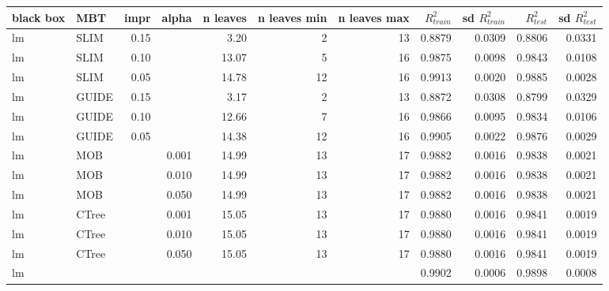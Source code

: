 \begin{table}[!htb]

\centering \tiny
\begin{tabular}[t]{l|l|r|r|r|r|r|r|r|r|r}
\hline
black box & MBT & impr & alpha & n leaves & n leaves min & n leaves max &  $R^2_{train}$ & sd $R^2_{train}$ & $R^2_{test}$ & sd $R^2_{test}$\\
\hline
lm & SLIM & 0.15 & & 3.20 & 2 & 13 & 0.8879 & 0.0309 & 0.8806 & 0.0331\\
lm & SLIM & 0.10 & & 13.07 & 5 & 16 & 0.9875 & 0.0098 & 0.9843 & 0.0108\\
lm & SLIM & 0.05 & & 14.78 & 12 & 16 & 0.9913 & 0.0020 & 0.9885 & 0.0028\\
lm & GUIDE & 0.15 & & 3.17 & 2 & 13 & 0.8872 & 0.0308 & 0.8799 & 0.0329\\
lm & GUIDE & 0.10 & & 12.66 & 7 & 16 & 0.9866 & 0.0095 & 0.9834 & 0.0106\\
lm & GUIDE & 0.05 & & 14.38 & 12 & 16 & 0.9905 & 0.0022 & 0.9876 & 0.0029\\
lm & MOB & & 0.001 & 14.99 & 13 & 17 & 0.9882 & 0.0016 & 0.9838 & 0.0021\\
lm & MOB & & 0.010 & 14.99 & 13 & 17 & 0.9882 & 0.0016 & 0.9838 & 0.0021\\
lm & MOB & & 0.050 & 14.99 & 13 & 17 & 0.9882 & 0.0016 & 0.9838 & 0.0021\\
lm & CTree & & 0.001 & 15.05 & 13 & 17 & 0.9880 & 0.0016 & 0.9841 & 0.0019\\
lm & CTree & & 0.010 & 15.05 & 13 & 17 & 0.9880 & 0.0016 & 0.9841 & 0.0019\\
lm & CTree & & 0.050 & 15.05 & 13 & 17 & 0.9880 & 0.0016 & 0.9841 & 0.0019\\

\hline
lm & & & & & & & 0.9902 & 0.0006 & 0.9898 & 0.0008\\
\hline



\end{tabular}
\end{table}
